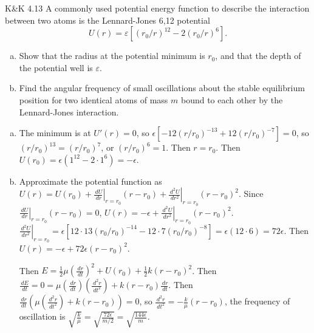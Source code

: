 \documentclass{esg8012pset}
\renewcommand{\d}{\,d}
\begin{document}
\begin{problem}{K\&K 4.13}
  A commonly used potential energy function to describe the interaction between two atoms is the Lennard-Jones 6,12 potential
  $$U(r) = \varepsilon\left[(r_0 / r)^{12} - 2(r_0 / r)^6\right].$$
  \begin{enumerate}[(a)]
  \item Show that the radius at the potential minimum is $r_0$, and that the depth of the potential well is $\varepsilon$.
    \item Find the angular frequency of small oscillations about the stable equilibrium position for two identical atoms of mass $m$ bound to each other by the Lennard-Jones interaction.
  \end{enumerate}
\end{problem}
\begin{solution}
\begin{enumerate}[a)]
  \item The minimum is at $U'(r) = 0$, so $\epsilon\left[-12(r / r_0)^{-13} + 12(r / r_0)^{-7}\right] = 0$, so $(r / r_0)^{13} = (r / r_0)^{7}$, or $(r / r_0)^6 = 1$.  Then $r = r_0$.  Then $U(r_0) = \epsilon(1^12 - 2\cdot 1^6) = -\epsilon$.
  \item Approximate the potential function as $U(r) = U(r_0) + \left.\frac{\d U}{\d r}\right|_{r=r_0}(r-r_0) + \left.\frac{\d^2 U}{\d r^2}\right|_{r=r_0}(r-r_0)^2$.  Since $\left.\frac{\d U}{\d r}\right|_{r=r_0}(r-r_0) = 0$, $U(r) = -\epsilon + \left.\frac{\d^2 U}{\d r^2}\right|_{r=r_0}(r-r_0)^2$.  $\left.\frac{\d^2 U}{\d r^2}\right|_{r=r_0} = \epsilon\left[12\cdot 13 (r_0 / r_0)^{-14} -12\cdot 7(r_0/r_0)^{-8}\right] = \epsilon(12\cdot 6) = 72\epsilon$.  Then $U(r) = -\epsilon + 72\epsilon(r - r_0)^2$. \par
  Then $E = \frac{1}{2}\mu\left(\frac{\d r}{\d t}\right)^2 + U(r_0) + \frac{1}{2}k(r-r_0)^2$.  Then $\frac{\d E}{\d t} = 0 = \mu\left(\frac{\d r}{\d t}\right)\left(\frac{\d^2 r}{\d t^2}\right) + k(r - r_0)\frac{\d r}{\d t}$.  Then $\frac{\d r}{\d t}\left(\mu \left(\frac{\d^2 r}{\d t^2}\right) + k(r - r_0)\right) = 0$, so $\frac{\d^2 r}{\d t^2} = -\frac{k}{\mu}(r - r_0)$, the frequency of oscillation is $\sqrt{\frac{k}{\mu}} = \sqrt{\frac{72\epsilon}{m / 2}} = \sqrt{\frac{144\epsilon}{m}}$.
\end{enumerate}
\end{solution}
\end{document}
